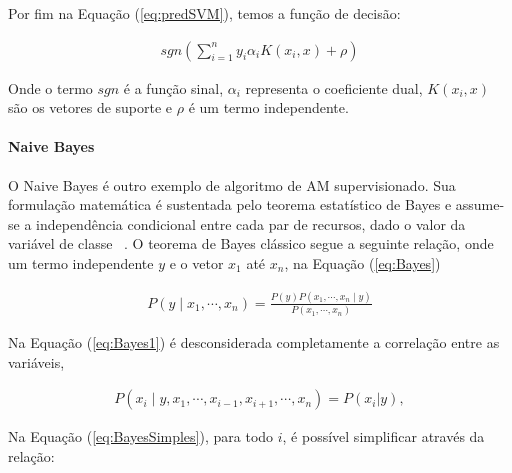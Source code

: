        Por fim na Equação (\ref{eq:predSVM}), temos a função de decisão:

         \begin{equation}\label{eq:predSVM}
          \begin{aligned}
            sgn(\sum_{i=1}^{n}y_{i}\alpha_{i}K(x_{i},x)+\rho )
        \end{aligned}
        \end{equation}
        
        Onde o termo $sgn$ é a função sinal, $\alpha_{i}$ representa o coeficiente dual, $K(x_{i},x)$ são os vetores de suporte e $\rho$ é um termo independente.



        \paragraph{Naive Bayes}

        O Naive Bayes é outro exemplo de algoritmo de \acrshort{AM} supervisionado. Sua formulação matemática é sustentada pelo teorema estatístico de Bayes e assume-se a independência condicional entre cada par de recursos, dado o valor da variável de classe ~\cite{McCallum98acomparison}. O teorema de Bayes clássico segue a seguinte relação, onde um termo independente $y$ e o vetor $x_{1}$ até $x_{n}$, na 
        Equação (\ref{eq:Bayes})

        \begin{equation}\label{eq:Bayes}
          \begin{aligned}
            P\left ( y\mid x_{1},\cdots, x_{n} \right ) = \frac{P(y)P(x_{1},\cdots,x_{n}\mid y)}{P(x_{1},\cdots, x_{n})}
        \end{aligned}
        \end{equation}
        

        Na Equação (\ref{eq:Bayes1}) é desconsiderada completamente a correlação entre as variáveis, 


        \begin{equation}\label{eq:Bayes1}
          \begin{aligned}
            P\left ( x_{i}\mid y,x_{1}, \cdots,x_{i-1},x_{i+1},\cdots, x_{n} \right ) = P(x_{i}|y),
        \end{aligned}
        \end{equation}


        Na Equação (\ref{eq:BayesSimples}), para todo $i$, é possível simplificar através da relação:


